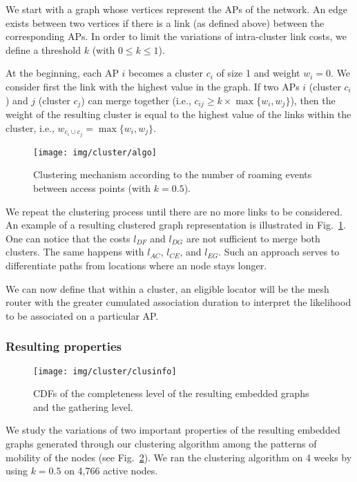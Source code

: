 \documentclass[a4paper]{sig-alternate-10pt}
\begin{document}
We start with a graph whose vertices represent the APs of the
network. An edge exists between two vertices if there is a link (as
defined above) between the corresponding APs. In order to limit the
variations of intra-cluster link costs, we define a threshold $k$
(with $0\leq k\leq 1$).

At the beginning, each AP $i$ becomes a cluster $c_i$ of size 1 and
weight $w_i=0$. We consider first the link with the highest value in
the graph. If two APs $i$ (cluster $c_i$) and $j$ (cluster $c_j$)
can merge together (i.e., $c_{ij}\geq k \times \max\{w_i,w_j\}$),
then the weight of the resulting cluster is equal to the highest
value of the links within the cluster, i.e., $w_{c_{i} \cup c_{j}} =
\max\{w_i,w_j\}$.

\begin{figure}[t!]
\begin{center}
\texttt{[image: img/cluster/algo]}
\caption{Clustering mechanism according to the number of roaming
events between access points (with $k=0.5$).} \label{fig:clusters}
\end{center}
\end{figure}

We repeat the clustering process until there are no more links to be
considered. An example of a resulting clustered graph representation
is illustrated in Fig.~\ref{fig:clusters}. One can notice that the
costs $l_{DF}$ and $l_{DG}$ are not sufficient to merge both
clusters. The same happens with $l_{AC}$, $l_{CE}$, and $l_{EG}$.
Such an approach serves to differentiate paths from locations where
an node stays longer.

We can now define that within a cluster, an eligible locator will 
be the mesh router with the greater cumulated association duration to 
interpret the likelihood to be associated on a particular AP. 

\subsubsection{Resulting properties}

\begin{figure}
\texttt{[image: img/cluster/clusinfo]}
\caption{CDFs of the completeness level of the resulting embedded
graphs and the gathering level.} \label{fig_clus_properties}
\end{figure}

We study the variations of two important properties of the resulting
embedded graphs generated through our clustering algorithm among the
patterns of mobility of the nodes (see
Fig.~\ref{fig_clus_properties}). We ran the clustering algorithm on
4 weeks by using $k=0.5$ on 4,766 active nodes.\vspace{2mm}
\end{document}
